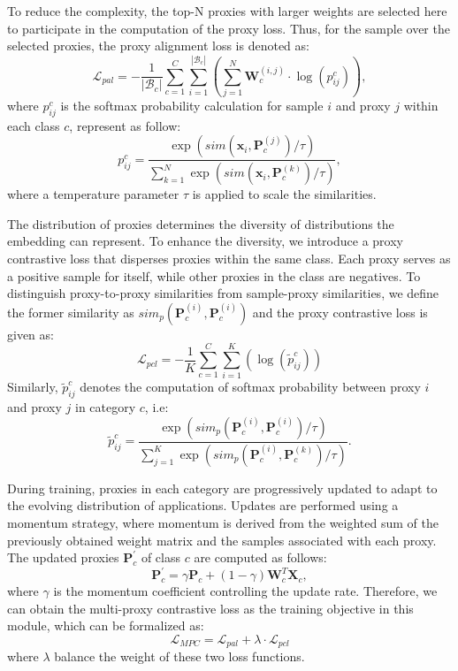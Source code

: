 To reduce the complexity, the top-N proxies with larger weights are selected here to participate in the computation of the proxy loss. Thus, for the sample over the selected proxies, the proxy alignment loss is denoted as:
\begin{equation}
\mathcal{L}_{pal}=-\frac{1}{|\mathcal{B}_c|} \sum_{c=1}^C \sum_{i=1}^{|\mathcal{B}_c|}\left(\sum_{j=1}^N \mathbf{W}_c^{(i, j)} \cdot \log \left(p_{i j}^c\right)\right),
\end{equation}
where $p_{i j}^c$ is the softmax probability calculation for sample $i$ and proxy $j$ within each class $c$, represent as follow:
\begin{equation}
p_{i j}^c=\frac{\exp \left(sim(\mathbf{x}_i, \mathbf{P}_c^{(j)}) / \tau\right)}{\sum_{k=1}^N \exp \left(sim(\mathbf{x}_i, \mathbf{P}_c^{(k)}) / \tau\right)},
\end{equation}
where a temperature parameter $\tau$ is applied to scale the similarities.

The distribution of proxies determines the diversity of distributions the embedding can represent. To enhance the diversity, we introduce a proxy contrastive loss that disperses proxies within the same class. Each proxy serves as a positive sample for itself, while other proxies in the class are negatives. To distinguish proxy-to-proxy similarities from sample-proxy similarities, we define the former similarity as $sim_p(\mathbf{P}_c^{(i)}, \mathbf{P}_c^{(i)})$ and the proxy contrastive loss is given as:
\begin{equation}
\mathcal{L}_{pcl}=-\frac{1}{K} \sum_{c=1}^C \sum_{i=1}^K\left(\log \left(\tilde{p}_{ij}^c\right)\right)
\end{equation}
Similarly, $\tilde{p}_{ij}^c$ denotes the computation of softmax probability between proxy $i$ and proxy $j$ in category $c$, i.e:
\begin{equation}
\tilde{p}_{ij}^c = \frac{\exp \left(sim_p(\mathbf{P}_c^{(i)}, \mathbf{P}_c^{(i)}) / \tau\right)}{\sum_{j=1}^K \exp \left(sim_p(\mathbf{P}_c^{(i)}, \mathbf{P}_c^{(k)}) / \tau\right)}.
\end{equation}

During training, proxies in each category are progressively updated to adapt to the evolving distribution of applications. Updates are performed using a momentum strategy, where momentum is derived from the weighted sum of the previously obtained weight matrix and the samples associated with each proxy. The updated proxies $\mathbf{P}_c^{\prime}$ of class $c$ are computed as follows:
\begin{equation}
\mathbf{P}_c^{\prime}=\gamma \mathbf{P}_c+(1-\gamma) \mathbf{W}_c^T \mathbf{X}_c,
\end{equation}
where $\gamma$ is the momentum coefficient controlling the update rate. Therefore, we can obtain the multi-proxy contrastive loss as the training objective in this module, which can be formalized as:
\begin{equation}
\mathcal{L}_{MPC} = \mathcal{L}_{pal} + \lambda \cdot \mathcal{L}_{pcl}
\end{equation}
where $\lambda$ balance the weight of these two loss functions.




